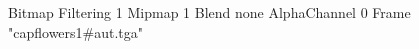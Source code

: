 {Bitmap
	{Filtering 1}
	{Mipmap 1}
	{Blend none}
	{AlphaChannel 0}
	{Frame "capflowers1#aut.tga"}
}

